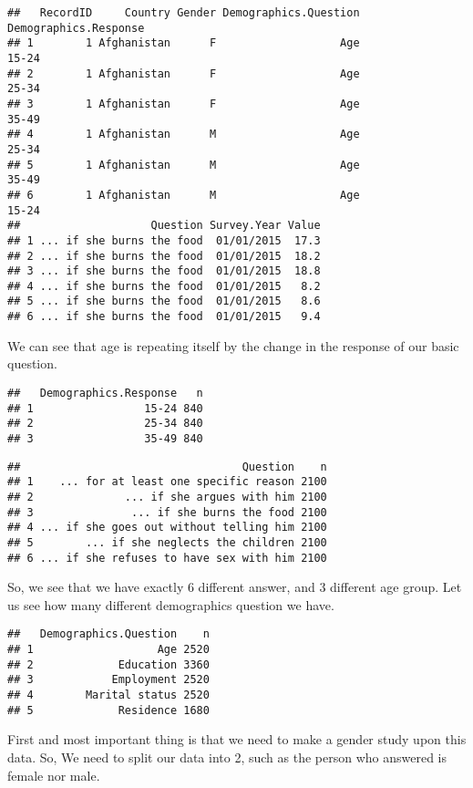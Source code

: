 \documentclass[
]{article}
\begin{document}
\begin{verbatim}
##   RecordID     Country Gender Demographics.Question Demographics.Response
## 1        1 Afghanistan      F                   Age                 15-24
## 2        1 Afghanistan      F                   Age                 25-34
## 3        1 Afghanistan      F                   Age                 35-49
## 4        1 Afghanistan      M                   Age                 25-34
## 5        1 Afghanistan      M                   Age                 35-49
## 6        1 Afghanistan      M                   Age                 15-24
##                    Question Survey.Year Value
## 1 ... if she burns the food  01/01/2015  17.3
## 2 ... if she burns the food  01/01/2015  18.2
## 3 ... if she burns the food  01/01/2015  18.8
## 4 ... if she burns the food  01/01/2015   8.2
## 5 ... if she burns the food  01/01/2015   8.6
## 6 ... if she burns the food  01/01/2015   9.4
\end{verbatim}

We can see that age is repeating itself by the change in the response of
our basic question.

\begin{verbatim}
##   Demographics.Response   n
## 1                 15-24 840
## 2                 25-34 840
## 3                 35-49 840
\end{verbatim}

\begin{verbatim}
##                                  Question    n
## 1    ... for at least one specific reason 2100
## 2              ... if she argues with him 2100
## 3               ... if she burns the food 2100
## 4 ... if she goes out without telling him 2100
## 5        ... if she neglects the children 2100
## 6 ... if she refuses to have sex with him 2100
\end{verbatim}

So, we see that we have exactly 6 different answer, and 3 different age
group. Let us see how many different demographics question we have.

\begin{verbatim}
##   Demographics.Question    n
## 1                   Age 2520
## 2             Education 3360
## 3            Employment 2520
## 4        Marital status 2520
## 5             Residence 1680
\end{verbatim}

First and most important thing is that we need to make a gender study
upon this data. So, We need to split our data into 2, such as the person
who answered is female nor male.
\end{document}
